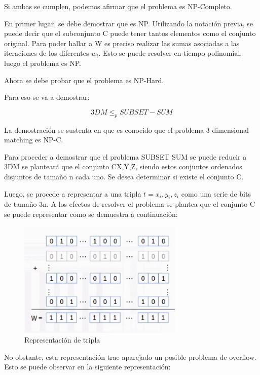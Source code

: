Si ambas se cumplen, podemos afirmar que el problema es NP-Completo.

En primer lugar, se debe demostrar que es NP. Utilizando la notación previa, se puede decir que el subconjunto C puede tener tantos elementos como el conjunto original. Para poder hallar a W es preciso realizar las sumas asociadas a las iteraciones de los diferentes $w_{i}$. Esto se puede resolver en tiempo polinomial, luego el problema es NP.

Ahora se debe probar que el problema es NP-Hard. 

Para eso se va a demostrar:

\begin{equation}
    3DM \leq_{p} SUBSET-SUM
\end{equation}

La demostración se sustenta en que es conocido que el problema 3 dimensional matching es NP-C.

Para proceder a demostrar que el problema SUBSET SUM se puede reducir a 3DM se planteará que el conjunto C\subseteq X,Y,Z, siendo estos conjuntos ordenados disjuntos de tamaño n cada uno. Se desea determinar si existe el conjunto C.

Luego, se procede a representar a una tripla $t={x_{i}, y_{i}, z_{i}}$ como una serie de bits de tamaño 3n. A los efectos de resolver el problema se plantea que el conjunto C se puede representar como se demuestra a continuación:

\begin{figure}[H]
\centering
\includegraphics[width=0.7\textwidth]{Informe/Imagenes/Parte2/imagen1.png}
\caption{\label{fig:class01}Representación de tripla}
\end{figure}

No obstante, esta representación trae aparejado un posible problema de overflow. Esto se puede observar en la siguiente representación:

